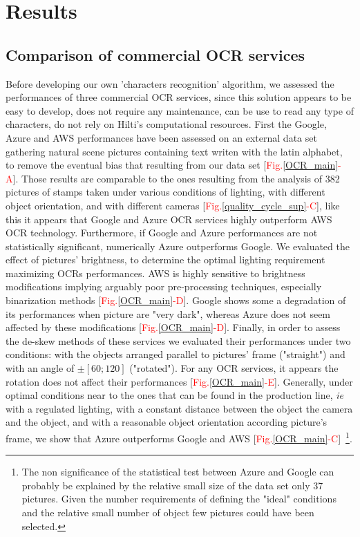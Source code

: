 \documentclass[12pt, french, a4paper]{article} %
\begin{document}
\section{Results}
\subsection{Comparison of commercial OCR services }
Before developing our own 'characters recognition' algorithm, we assessed the performances of three commercial \gls{OCR} services, since this solution appears to be easy to develop, does not require any maintenance, can be use to read any type of characters, do not rely on Hilti's computational resources. First the Google, Azure and AWS \cite{GoogleOCR,AzureOCR,AWSOCR} performances have been assessed on an external data set gathering natural scene pictures containing text writen with the latin alphabet, to remove the eventual bias that resulting from our data set [\textcolor{red}{Fig.}\ref{OCR_main}\textcolor{red}{-A}]. Those results are comparable to the ones resulting from the analysis of 382 pictures of stamps taken under various conditions of lighting, with different object orientation, and with different cameras [\textcolor{red}{Fig.}\ref{quality_cycle_sup}\textcolor{red}{-C}], like this it appears that Google and Azure OCR services highly outperform AWS \gls{OCR} technology. Furthermore, if Google and Azure performances are not statistically significant, numerically Azure outperforms Google. We evaluated the effect of pictures' brightness, to determine the optimal lighting requirement maximizing OCRs performances. AWS is highly sensitive to brightness modifications implying arguably poor pre-processing techniques, especially binarization methods [\textcolor{red}{Fig.}\ref{OCR_main}\textcolor{red}{-D}]. Google shows some a degradation of its performances when picture are "very dark", whereas Azure does not seem affected by these modifications [\textcolor{red}{Fig.}\ref{OCR_main}\textcolor{red}{-D}]. Finally, in order to assess the de-skew methods of these services we evaluated their performances under two conditions: with the objects arranged parallel to pictures' frame ("straight") and with an angle of $\pm[60;120]$ ("rotated"). For any OCR services, it appears the rotation does not affect their performances [\textcolor{red}{Fig.}\ref{OCR_main}\textcolor{red}{-E}]. Generally, under optimal conditions near to the ones that can be found in the production line, \textit{ie} with a regulated lighting, with a constant distance between the object the camera and the object, and with a reasonable object orientation according picture's frame, we show that Azure outperforms Google and AWS [\textcolor{red}{Fig.}\ref{OCR_main}\textcolor{red}{-C}] \footnote{The non significance of the statistical test between Azure and Google can probably be explained by the relative small size of the data set only 37 pictures. Given the number requirements of defining the "ideal" conditions and the relative small number of object few pictures could have been selected.}. \\
\end{document}
